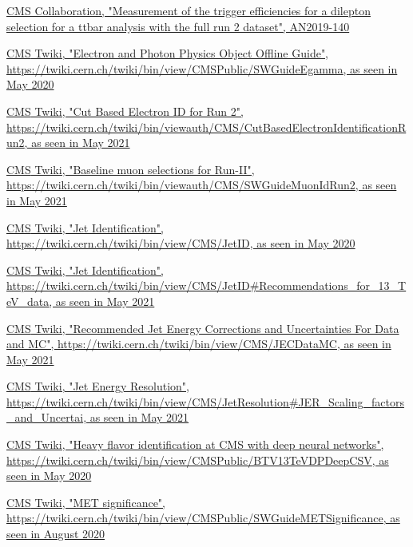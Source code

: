 \documentclass[a4paper, 10pt, openright]{report}
\begin{document}
\begin{thebibliography}{1}
\href{http://cms.cern.ch/iCMS/user/noteinfo?cmsnoteid=CMS\%20AN-2019/140}{CMS Collaboration,
"Measurement of the trigger efficiencies for a dilepton selection for a ttbar analysis with the full run 2 dataset", AN2019-140}

\href{https://twiki.cern.ch/twiki/bin/view/CMSPublic/SWGuideEgamma}{\ac{CMS} Twiki,
"Electron and Photon Physics Object Offline Guide", \url{https://twiki.cern.ch/twiki/bin/view/CMSPublic/SWGuideEgamma}, as seen in May 2020}

\href{https://twiki.cern.ch/twiki/bin/viewauth/CMS/CutBasedElectronIdentificationRun2}{\ac{CMS} Twiki,
"Cut Based Electron ID for Run 2", \url{https://twiki.cern.ch/twiki/bin/viewauth/CMS/CutBasedElectronIdentificationRun2}, as seen in May 2021}

\href{https://twiki.cern.ch/twiki/bin/viewauth/CMS/SWGuideMuonIdRun2}{\ac{CMS} Twiki,
"Baseline muon selections for Run-II", \url{https://twiki.cern.ch/twiki/bin/viewauth/CMS/SWGuideMuonIdRun2}, as seen in May 2021}

\href{https://twiki.cern.ch/twiki/bin/view/CMS/JetID}{\ac{CMS} Twiki,
"Jet Identification", \url{https://twiki.cern.ch/twiki/bin/view/CMS/JetID}, as seen in May 2020}

\href{https://twiki.cern.ch/twiki/bin/view/CMS/JetID\#Recommendations\_for\_13\_TeV\_data}{\ac{CMS} Twiki,
"Jet Identification", \url{https://twiki.cern.ch/twiki/bin/view/CMS/JetID\#Recommendations\_for\_13\_TeV\_data}, as seen in May 2021}

\href{https://twiki.cern.ch/twiki/bin/view/CMS/JECDataMC}{\ac{CMS} Twiki,
"Recommended Jet Energy Corrections and Uncertainties For Data and MC", \url{https://twiki.cern.ch/twiki/bin/view/CMS/JECDataMC}, as seen in May 2021}

\href{https://twiki.cern.ch/twiki/bin/view/CMS/JetResolution\#JER_Scaling_factors_and_Uncertai}{\ac{CMS} Twiki,
"Jet Energy Resolution", \url{https://twiki.cern.ch/twiki/bin/view/CMS/JetResolution\#JER_Scaling_factors_and_Uncertai}, as seen in May 2021}

\href{https://twiki.cern.ch/twiki/bin/view/CMSPublic/BTV13TeVDPDeepCSV}{\ac{CMS} Twiki,
"Heavy flavor identification at CMS with deep neural networks", \url{https://twiki.cern.ch/twiki/bin/view/CMSPublic/BTV13TeVDPDeepCSV}, as seen in May 2020}

\href{https://twiki.cern.ch/twiki/bin/view/CMSPublic/SWGuideMETSignificance}{\ac{CMS} Twiki, "MET significance", \url{https://twiki.cern.ch/twiki/bin/view/CMSPublic/SWGuideMETSignificance}, as seen in August 2020}


\end{thebibliography}
\end{document}
